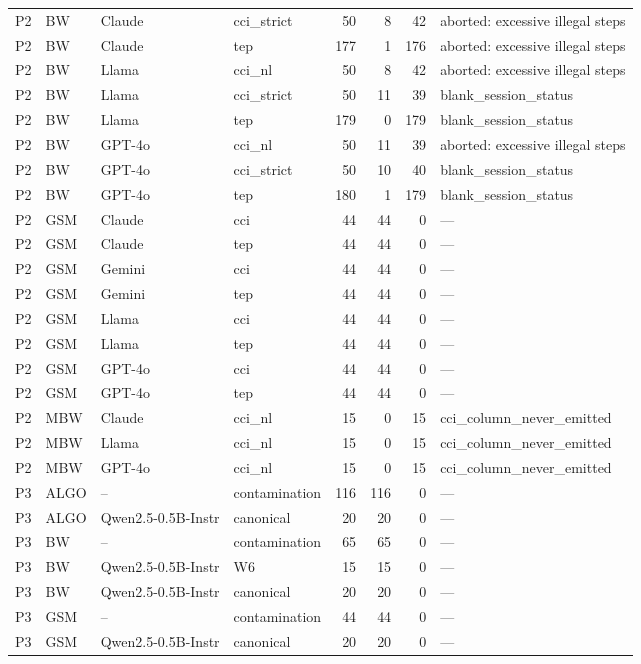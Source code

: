 \begin{table}[t]
\begin{tabular}{llllrrrl}
    P2 & BW & Claude & cci\_strict & 50 & 8 & 42 & aborted: excessive illegal steps \\
    P2 & BW & Claude & tep & 177 & 1 & 176 & aborted: excessive illegal steps \\
    P2 & BW & Llama & cci\_nl & 50 & 8 & 42 & aborted: excessive illegal steps \\
    P2 & BW & Llama & cci\_strict & 50 & 11 & 39 & blank\_session\_status \\
    P2 & BW & Llama & tep & 179 & 0 & 179 & blank\_session\_status \\
    P2 & BW & GPT-4o & cci\_nl & 50 & 11 & 39 & aborted: excessive illegal steps \\
    P2 & BW & GPT-4o & cci\_strict & 50 & 10 & 40 & blank\_session\_status \\
    P2 & BW & GPT-4o & tep & 180 & 1 & 179 & blank\_session\_status \\
    P2 & GSM & Claude & cci & 44 & 44 & 0 & --- \\
    P2 & GSM & Claude & tep & 44 & 44 & 0 & --- \\
    P2 & GSM & Gemini & cci & 44 & 44 & 0 & --- \\
    P2 & GSM & Gemini & tep & 44 & 44 & 0 & --- \\
    P2 & GSM & Llama & cci & 44 & 44 & 0 & --- \\
    P2 & GSM & Llama & tep & 44 & 44 & 0 & --- \\
    P2 & GSM & GPT-4o & cci & 44 & 44 & 0 & --- \\
    P2 & GSM & GPT-4o & tep & 44 & 44 & 0 & --- \\
    P2 & MBW & Claude & cci\_nl & 15 & 0 & 15 & cci\_column\_never\_emitted \\
    P2 & MBW & Llama & cci\_nl & 15 & 0 & 15 & cci\_column\_never\_emitted \\
    P2 & MBW & GPT-4o & cci\_nl & 15 & 0 & 15 & cci\_column\_never\_emitted \\
    P3 & ALGO & -- & contamination & 116 & 116 & 0 & --- \\
    P3 & ALGO & Qwen2.5-0.5B-Instr & canonical & 20 & 20 & 0 & --- \\
    P3 & BW & -- & contamination & 65 & 65 & 0 & --- \\
    P3 & BW & Qwen2.5-0.5B-Instr & W6 & 15 & 15 & 0 & --- \\
    P3 & BW & Qwen2.5-0.5B-Instr & canonical & 20 & 20 & 0 & --- \\
    P3 & GSM & -- & contamination & 44 & 44 & 0 & --- \\
    P3 & GSM & Qwen2.5-0.5B-Instr & canonical & 20 & 20 & 0 & --- \\
    \bottomrule
  \end{tabular}
\end{table}
